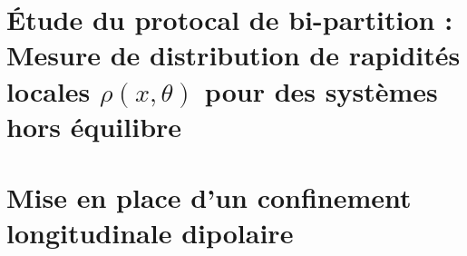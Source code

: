 \chapter{Étude du protocal de bi-partition : Mesure de distribution de rapidités locales $\rho(x , \theta ) $  pour des systèmes hors équilibre}
\minitoc


\chapter{Mise en place d'un confinement longitudinale dipolaire}
\minitoc


%
%	







%
%

%

%

